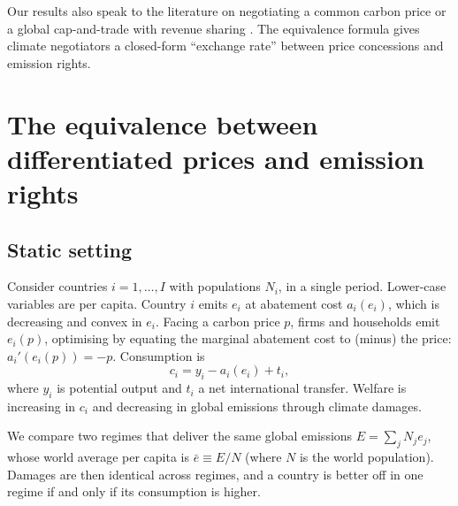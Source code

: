 \documentclass[12pt,english]{article}
\theoremstyle{remark}
\begin{document}
Our results also speak to the literature on negotiating a common carbon price or a global cap-and-trade with revenue sharing \citep{grubb_greenhouse_1990,weitzman_can_2014,gollier_negotiating_2015,cramton_global_2017,nordhaus_climate_2015,fabre_global_2024}. The equivalence
formula gives climate negotiators a closed-form  ``exchange rate'' between price
concessions and emission rights.
\section{The equivalence between differentiated prices and emission rights}
\label{sec:theory}

\subsection{Static setting}

Consider countries $i=1,\dots,I$ with populations $N_i$, %
in a single period. Lower-case variables are per capita. Country $i$ emits $e_i$ at abatement cost $a_i(e_i)$, which is decreasing and convex in $e_i$. Facing a carbon price $p$, firms and households emit $e_i(p)$, optimising by equating the marginal abatement cost to (minus) the price: $a_i'(e_i(p)) = -p$. Consumption is
\begin{equation}
  c_i = y_i - a_i(e_i) + t_i,
\end{equation}
where $y_i$ is potential output and $t_i$ a net international transfer. Welfare is increasing in $c_i$ and decreasing in global emissions through climate damages. 

We compare two regimes that deliver the same global emissions $E=\sum_j N_j e_j$, whose world average per capita is $\bar e\equiv E/N$ (where $N$ is the world population).
Damages are then identical across regimes, and a country is better off in one regime if and only if its consumption is higher.
\end{document}
